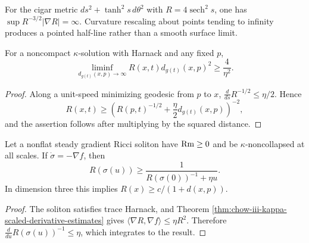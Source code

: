 \begin{remark}
\label{rem:chow-iii-cigar-scaled-derivative-failure}

For the cigar metric $ds^2+\tanh^2s\,d\theta^2$ with
$R=4\operatorname{sech}^2s$, one has
$\sup R^{-3/2}|\nabla R|=\infty$.  Curvature rescaling about points tending
to infinity produces a pointed half-line rather than a smooth surface limit.
\end{remark}

\begin{corollary}
\label{cor:chow-iii-kappa-quadratic-curvature-lower-bound}


For a noncompact $\kappa$-solution with Harnack and any fixed $p$,
\[
 \liminf_{d_{g(t)}(x,p)\to\infty}R(x,t)d_{g(t)}(x,p)^2
 \ge\frac4{\eta^2}.
\]
\end{corollary}
\begin{proof}
\sketch Along a unit-speed minimizing geodesic from $p$ to $x$,
$\frac d{ds}R^{-1/2}\le\eta/2$.  Hence
\[
 R(x,t)\ge
 \left(R(p,t)^{-1/2}+\frac\eta2d_{g(t)}(x,p)\right)^{-2},
\]
and the assertion follows after multiplying by the squared distance.
\end{proof}

\begin{corollary}
\label{cor:chow-iii-steady-soliton-flowline-curvature-lower-bound}


Let a nonflat steady gradient Ricci soliton have $\operatorname{Rm}\ge0$ and be
$\kappa$-noncollapsed at all scales.  If
$\dot\sigma=-\nabla f$, then
\[
 R(\sigma(u))\ge
 \frac1{R(\sigma(0))^{-1}+\eta u}.
\]
In dimension three this implies $R(x)\ge c/(1+d(x,p))$.
\end{corollary}
\begin{proof}
\sketch The soliton satisfies trace Harnack, and Theorem
\ref{thm:chow-iii-kappa-scaled-derivative-estimates} gives
$\langle\nabla R,\nabla f\rangle\le\eta R^2$.  Therefore
$\frac d{du}R(\sigma(u))^{-1}\le\eta$, which integrates to the result.
\end{proof}

